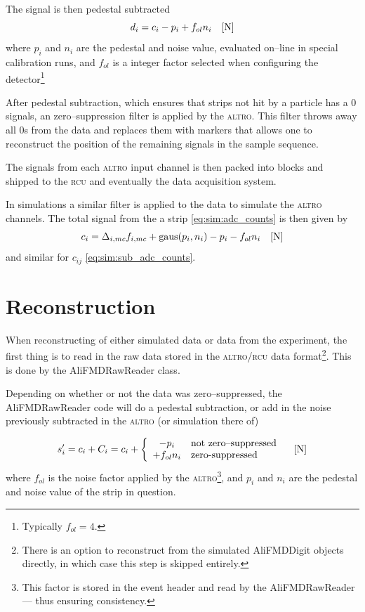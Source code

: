 \documentclass[11pt]{article}
\def\N#1{\unit[#1]{N}}
\def\ALTRO{{\scshape altro}}
\def\RCU{{\scshape rcu}}
\def\class#1{{\small\ttfamily #1}}
\begin{document}
The signal is then pedestal subtracted 
\begin{equation}
  \label{eq:sim:pedestal_subtraction}
  d_i = c_i - p_i + f_{ol} n_i\quad[\N{}]
\end{equation}
where $p_i$ and $n_i$ are the pedestal and noise value, evaluated
on--line in special calibration runs, and $f_{ol}$ is a integer factor
selected when configuring the detector\footnote{Typically $f_{ol}=4$.} 

After pedestal subtraction, which ensures that strips not hit by a
particle has a 0 signals, an zero--suppression filter is applied by
the \ALTRO{}.  This filter throws away all 0s from the data and
replaces them with markers that allows one to reconstruct the position
of the remaining signals in the sample sequence.  

The signals from each \ALTRO{} input channel is then packed into
blocks and shipped to the \RCU{} and eventually the data acquisition
system. 

In simulations a similar filter is applied to the data to simulate the
\ALTRO{} channels.  The total signal from the a strip
\eqref{eq:sim:adc_counts} is then given by 
\begin{equation}
  \label{eq:raw:sim_digits}
  c_i = \Delta_{i,mc} f_{i,mc} + \text{gaus}(p_i,n_i) - p_i - f_{ol} n_i \quad[\N{}]
\end{equation}
and similar for $c_{ij}$ \eqref{eq:sim:sub_adc_counts}.

\section*{Reconstruction} 

When reconstructing of either simulated data or data from the
experiment, the first thing is to read in the raw data stored in the
\ALTRO{}/\RCU{} data format\footnote{There is an option to reconstruct
  from the simulated \class{AliFMDDigit} objects directly, in which
  case this step is skipped entirely.}.  This is done by the
\class{AliFMDRawReader} class.  

Depending on whether or not the data was zero--suppressed, the
\class{AliFMDRawReader} code will do a pedestal subtraction, or add in
the noise previously subtracted in the \ALTRO{} (or simulation there
of) 

\begin{equation}
  \label{eq:reco:pedestal_subtraction}
  s'_i = c_i + C_i = c_i + \left\{
    \begin{array}{cl}
      - p_i & \text{not zero--suppressed}\\ 
      + f_{ol} n_i & \text{zero-suppressed} 
    \end{array}\right.\quad[\N{}]
\end{equation}
where $f_{ol}$ is the noise factor applied by the \ALTRO{}\footnote{This
  factor is stored in the event header and read by the
  \class{AliFMDRawReader} --- thus ensuring consistency.}, and $p_i$
and $n_i$ are the pedestal and noise value of the strip in question. 
\end{document}
